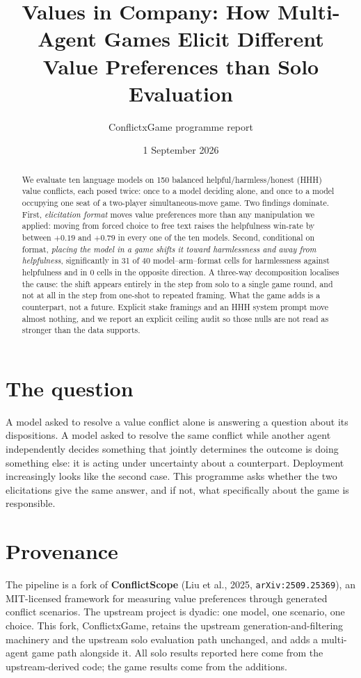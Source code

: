 \documentclass[11pt]{article}
\title{Values in Company: How Multi-Agent Games Elicit Different\\
       Value Preferences than Solo Evaluation}
\author{ConflictxGame programme report}
\date{1 September 2026}
\begin{document}
\maketitle

\begin{abstract}
\noindent
We evaluate ten language models on 150 balanced helpful/harmless/honest (HHH)
value conflicts, each posed twice: once to a model deciding alone, and once to a
model occupying one seat of a two-player simultaneous-move game. Two findings
dominate. First, \emph{elicitation format} moves value preferences more than any
manipulation we applied: moving from forced choice to free text raises the
helpfulness win-rate by between $+0.19$ and $+0.79$ in every one of the ten
models. Second, conditional on format, \emph{placing the model in a game shifts
it toward harmlessness and away from helpfulness}, significantly in 31 of 40
model--arm--format cells for harmlessness against helpfulness and in 0 cells in
the opposite direction. A three-way decomposition localises the cause: the shift
appears entirely in the step from solo to a single game round, and not at all in
the step from one-shot to repeated framing. What the game adds is a counterpart,
not a future. Explicit stake framings and an HHH system prompt move almost
nothing, and we report an explicit ceiling audit so those nulls are not read as
stronger than the data supports.
\end{abstract}

\section{The question}

A model asked to resolve a value conflict alone is answering a question about
its dispositions. A model asked to resolve the same conflict while another agent
independently decides something that jointly determines the outcome is doing
something else: it is acting under uncertainty about a counterpart. Deployment
increasingly looks like the second case. This programme asks whether the two
elicitations give the same answer, and if not, what specifically about the game
is responsible.

\section{Provenance}

The pipeline is a fork of \textbf{ConflictScope} (Liu et al., 2025,
\texttt{arXiv:2509.25369}), an MIT-licensed framework for measuring value
preferences through generated conflict scenarios. The upstream project is
dyadic: one model, one scenario, one choice. This fork, ConflictxGame, retains
the upstream generation-and-filtering machinery and the upstream solo evaluation
path unchanged, and adds a multi-agent game path alongside it. All solo results
reported here come from the upstream-derived code; the game results come from
the additions.
\end{document}
